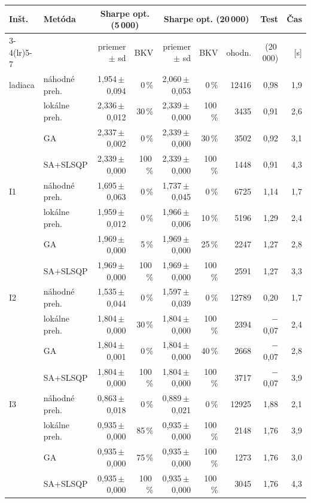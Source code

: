 \begin{tabular}{@{}llrrrrrrr@{}}
\toprule
Inšt. & Metóda & \multicolumn{2}{c}{Sharpe opt. (5\,000)} & \multicolumn{3}{c}{Sharpe opt. (20\,000)} & Test & Čas \\
\cmidrule(lr){3-4}\cmidrule(lr){5-7}
 & & priemer $\pm$ sd & BKV & priemer $\pm$ sd & BKV & ohodn. & (20\,000) & [s] \\
\midrule
ladiaca & náhodné preh. & 1{,}954\,$\pm$\,0{,}094 & 0\,\% & 2{,}060\,$\pm$\,0{,}053 & 0\,\% & 12416 & 0{,}98 & 1{,}9\\
 & lokálne preh. & 2{,}336\,$\pm$\,0{,}012 & 30\,\% & 2{,}339\,$\pm$\,0{,}000 & 100\,\% & 3435 & 0{,}91 & 2{,}6\\
 & GA & 2{,}337\,$\pm$\,0{,}002 & 0\,\% & 2{,}339\,$\pm$\,0{,}000 & 30\,\% & 3502 & 0{,}92 & 3{,}1\\
 & SA+SLSQP & 2{,}339\,$\pm$\,0{,}000 & 100\,\% & 2{,}339\,$\pm$\,0{,}000 & 100\,\% & 1448 & 0{,}91 & 4{,}3\\
\midrule
I1 & náhodné preh. & 1{,}695\,$\pm$\,0{,}063 & 0\,\% & 1{,}737\,$\pm$\,0{,}045 & 0\,\% & 6725 & 1{,}14 & 1{,}7\\
 & lokálne preh. & 1{,}959\,$\pm$\,0{,}012 & 0\,\% & 1{,}966\,$\pm$\,0{,}006 & 10\,\% & 5196 & 1{,}29 & 2{,}4\\
 & GA & 1{,}969\,$\pm$\,0{,}000 & 5\,\% & 1{,}969\,$\pm$\,0{,}000 & 25\,\% & 2247 & 1{,}27 & 2{,}8\\
 & SA+SLSQP & 1{,}969\,$\pm$\,0{,}000 & 100\,\% & 1{,}969\,$\pm$\,0{,}000 & 100\,\% & 2591 & 1{,}27 & 3{,}3\\
\midrule
I2 & náhodné preh. & 1{,}535\,$\pm$\,0{,}044 & 0\,\% & 1{,}597\,$\pm$\,0{,}039 & 0\,\% & 12789 & 0{,}20 & 1{,}7\\
 & lokálne preh. & 1{,}804\,$\pm$\,0{,}000 & 30\,\% & 1{,}804\,$\pm$\,0{,}000 & 100\,\% & 2394 & $-$0{,}07 & 2{,}4\\
 & GA & 1{,}804\,$\pm$\,0{,}001 & 0\,\% & 1{,}804\,$\pm$\,0{,}000 & 40\,\% & 2668 & $-$0{,}07 & 2{,}8\\
 & SA+SLSQP & 1{,}804\,$\pm$\,0{,}000 & 100\,\% & 1{,}804\,$\pm$\,0{,}000 & 100\,\% & 3717 & $-$0{,}07 & 3{,}9\\
\midrule
I3 & náhodné preh. & 0{,}863\,$\pm$\,0{,}018 & 0\,\% & 0{,}889\,$\pm$\,0{,}021 & 0\,\% & 12925 & 1{,}88 & 2{,}1\\
 & lokálne preh. & 0{,}935\,$\pm$\,0{,}000 & 85\,\% & 0{,}935\,$\pm$\,0{,}000 & 100\,\% & 2148 & 1{,}76 & 3{,}9\\
 & GA & 0{,}935\,$\pm$\,0{,}000 & 75\,\% & 0{,}935\,$\pm$\,0{,}000 & 100\,\% & 1273 & 1{,}76 & 3{,}0\\
 & SA+SLSQP & 0{,}935\,$\pm$\,0{,}000 & 100\,\% & 0{,}935\,$\pm$\,0{,}000 & 100\,\% & 3045 & 1{,}76 & 4{,}3\\
\bottomrule
\end{tabular}
